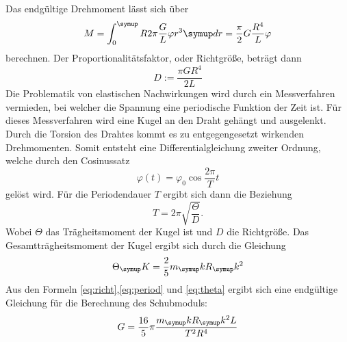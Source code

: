 Das endgültige Drehmoment lässt sich über
\begin{equation}
  M=\int_0^\su{R} 2\pi\frac{G}{L}\varphi r^3\su{dr}=\frac{\pi}{2}G\frac{R^4}
  {L}\varphi
  \label{eq:drehmoment}
\end{equation}
berechnen. Der Proportionalitätsfaktor, oder Richtgröße, beträgt dann
\begin{equation}
  D:=\frac{\pi GR^4}{2L}
  \label{eq:richt}
\end{equation}
Die Problematik von elastischen Nachwirkungen wird durch ein Messverfahren
vermieden, bei welcher die Spannung eine periodische Funktion der Zeit ist.
Für dieses Messverfahren wird eine Kugel an den Draht gehängt und ausgelenkt.
Durch die Torsion des Drahtes kommt es zu entgegengesetzt wirkenden Drehmomenten.
Somit entsteht eine Differentialgleichung zweiter Ordnung, welche durch den
Cosinussatz
\begin{equation}
  \varphi(t)=\varphi_0\cos\frac{2\pi}{T}t
\end{equation}
gelöst wird. Für die Periodendauer $T$ ergibt sich dann die Beziehung
\begin{equation}
  T=2\pi\sqrt{\frac{\Theta}{D}}.
  \label{eq:period}
\end{equation}
Wobei $\Theta$ das Trägheitsmoment der Kugel ist und $D$ die Richtgröße.
Das Gesamtträgheitsmoment der Kugel ergibt sich durch die Gleichung
\begin{equation}
  \Theta_\su{K}=\frac{2}{5} m_\su{k}R_\su{k}^2
  \label{eq:theta}
\end{equation}
Aus den Formeln \eqref{eq:richt},\eqref{eq:period} und \eqref{eq:theta} ergibt sich
eine endgültige Gleichung für die Berechnung des Schubmoduls:
\begin{equation}
  G= \frac{16}{5}\pi\frac{m_\su{k}R_\su{k}^2L}{T^2R^4}
  \label{eq:schub}
\end{equation}
